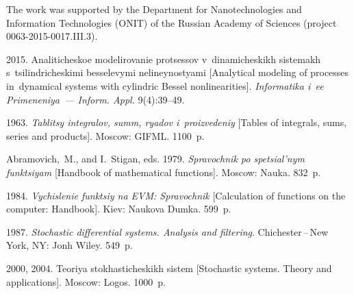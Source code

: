 


\vspace*{-9pt}

\Ack
\noindent
The work was supported by the Department for Nanotechnologies and Information Technologies
(ONIT) of the Russian Academy of Sciences (project 0063-2015-0017.III.3).



  \begin{multicols}{2}

\renewcommand{\bibname}{\protect\rmfamily References}

{\small\frenchspacing
 {%
 \begin{thebibliography}{9}


 2015.
Analiticheskoe modelirovanie protsessov v~dinamicheskikh sistemakh 
s~tsilindricheskimi besselevymi nelineynostyami [Analytical modeling of processes
in~dynamical systems with cylindric
Bessel nonlinearities]. 
\textit{Informatika i~ee Primeneniya~--- Inform. Appl.} 9(4):39--49.

 1963.
\textit{Tablitsy integralov, summ, ryadov i~proizvedeniy}
[Tables of integrals, sums, series and products]. Moscow: GIFML.  1100~p.

Abramovich,~M., and I.~Stigan, eds. 1979.
\textit{Spravochnik po spetsial'nym funktsiyam}
[Handbook of mathematical functions]. Moscow: Nauka. 832~p.

 1984.
\textit{Vychislenie funktsiy na EVM: Spravochnik}
[Calculation of functions on the computer: Handbook]. Kiev: Naukova Dumka.  599~p.

1987. \textit{Stochastic differential systems.
Analysis and filtering}. Chichester\,--\,New York, NY: Jonh Wiley.
549~p.


 2000, 2004.
Teoriya stokhasticheskikh sistem [Stochastic systems. Theory and  applications]. 
Moscow: Logos. 1000~p.  %



\end{thebibliography}}}
\end{multicols}
